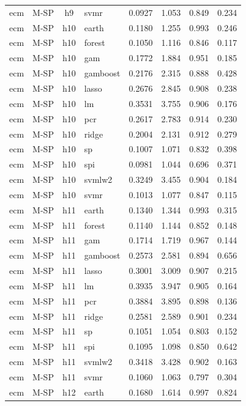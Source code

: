 \begin{ThreePartTable}
\begin{longtable}[t]{llclcccc}
ecm & M-SP & h9 & svmr & 0.0927 & 1.053 & 0.849 & 0.234\\
\addlinespace
ecm & M-SP & h10 & earth & 0.1180 & 1.255 & 0.993 & 0.246\\
ecm & M-SP & h10 & forest & 0.1050 & 1.116 & 0.846 & 0.117\\
ecm & M-SP & h10 & gam & 0.1772 & 1.884 & 0.951 & 0.185\\
ecm & M-SP & h10 & gamboost & 0.2176 & 2.315 & 0.888 & 0.428\\
ecm & M-SP & h10 & lasso & 0.2676 & 2.845 & 0.908 & 0.238\\
ecm & M-SP & h10 & lm & 0.3531 & 3.755 & 0.906 & 0.176\\
ecm & M-SP & h10 & pcr & 0.2617 & 2.783 & 0.914 & 0.230\\
ecm & M-SP & h10 & ridge & 0.2004 & 2.131 & 0.912 & 0.279\\
ecm & M-SP & h10 & sp & 0.1007 & 1.071 & 0.832 & 0.398\\
ecm & M-SP & h10 & spi & 0.0981 & 1.044 & 0.696 & 0.371\\
ecm & M-SP & h10 & svmlw2 & 0.3249 & 3.455 & 0.904 & 0.184\\
ecm & M-SP & h10 & svmr & 0.1013 & 1.077 & 0.847 & 0.115\\
\addlinespace
ecm & M-SP & h11 & earth & 0.1340 & 1.344 & 0.993 & 0.315\\
ecm & M-SP & h11 & forest & 0.1140 & 1.144 & 0.852 & 0.148\\
ecm & M-SP & h11 & gam & 0.1714 & 1.719 & 0.967 & 0.144\\
ecm & M-SP & h11 & gamboost & 0.2573 & 2.581 & 0.894 & 0.656\\
ecm & M-SP & h11 & lasso & 0.3001 & 3.009 & 0.907 & 0.215\\
ecm & M-SP & h11 & lm & 0.3935 & 3.947 & 0.905 & 0.164\\
ecm & M-SP & h11 & pcr & 0.3884 & 3.895 & 0.898 & 0.136\\
ecm & M-SP & h11 & ridge & 0.2581 & 2.589 & 0.901 & 0.234\\
ecm & M-SP & h11 & sp & 0.1051 & 1.054 & 0.803 & 0.152\\
ecm & M-SP & h11 & spi & 0.1095 & 1.098 & 0.850 & 0.642\\
ecm & M-SP & h11 & svmlw2 & 0.3418 & 3.428 & 0.902 & 0.163\\
ecm & M-SP & h11 & svmr & 0.1060 & 1.063 & 0.797 & 0.304\\
\addlinespace
ecm & M-SP & h12 & earth & 0.1680 & 1.614 & 0.997 & 0.824\\

\end{longtable}
\end{ThreePartTable}
